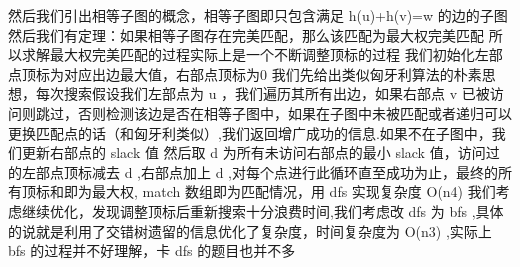 {}然后我们引出相等子图的概念，相等子图即只包含满足\markdownRendererDollarSign{} h(u)+h(v)=w \markdownRendererDollarSign{}的边的子图\markdownRendererParagraphSeparator
{}然后我们有定理：如果相等子图存在完美匹配，那么该匹配为最大权完美匹配\markdownRendererParagraphSeparator
{}所以求解最大权完美匹配的过程实际上是一个不断调整顶标的过程\markdownRendererParagraphSeparator
{}我们初始化左部点顶标为对应出边最大值，右部点顶标为0\markdownRendererParagraphSeparator
{}我们先给出类似匈牙利算法的朴素思想，每次搜索假设我们左部点为\markdownRendererDollarSign{} u \markdownRendererDollarSign{}，我们遍历其所有出边，如果右部点\markdownRendererDollarSign{} v \markdownRendererDollarSign{}已被访问则跳过，否则检测该边是否在相等子图中，如果在子图中未被匹配或者递归可以更换匹配点的话（和匈牙利类似）,我们返回增广成功的信息.如果不在子图中，我们更新右部点的\markdownRendererDollarSign{} slack \markdownRendererDollarSign{}值\markdownRendererParagraphSeparator
{}然后取\markdownRendererDollarSign{} d \markdownRendererDollarSign{}为所有未访问右部点的最小\markdownRendererDollarSign{} slack \markdownRendererDollarSign{}值，访问过的左部点顶标减去\markdownRendererDollarSign{} d \markdownRendererDollarSign{},右部点加上\markdownRendererDollarSign{} d\markdownRendererSoftLineBreak
{}\markdownRendererDollarSign{},对每个点进行此循环直至成功为止，最终的所有顶标和即为最大权,\markdownRendererDollarSign{} match \markdownRendererDollarSign{}数组即为匹配情况，用\markdownRendererDollarSign{} dfs \markdownRendererDollarSign{}实现复杂度\markdownRendererDollarSign{} O(n\markdownRendererCircumflex{}4) \markdownRendererDollarSign{}\markdownRendererInterblockSeparator
{}\markdownRendererInterblockSeparator
{}我们考虑继续优化，发现调整顶标后重新搜索十分浪费时间,我们考虑改\markdownRendererDollarSign{} dfs \markdownRendererDollarSign{}为\markdownRendererDollarSign{} bfs \markdownRendererDollarSign{},具体的说就是利用了交错树遗留的信息优化了复杂度，时间复杂度为\markdownRendererDollarSign{} O(n\markdownRendererCircumflex{}3) \markdownRendererDollarSign{},实际上\markdownRendererDollarSign{} bfs \markdownRendererDollarSign{}的过程并不好理解，卡\markdownRendererDollarSign{} dfs \markdownRendererDollarSign{}的题目也并不多\markdownRendererInterblockSeparator
{}\markdownRendererInterblockSeparator
{}
\markdownRendererSectionEnd \markdownRendererSectionBegin
{}\markdownRendererInterblockSeparator
